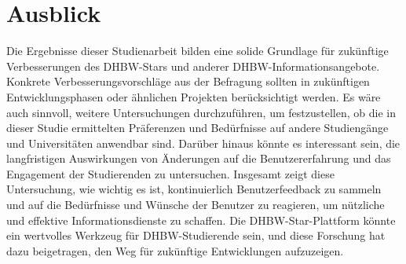 \section{Ausblick}
Die Ergebnisse dieser Studienarbeit bilden eine solide Grundlage für zukünftige Verbesserungen des DHBW-Stars und anderer DHBW-Informationsangebote. Konkrete Verbesserungsvorschläge aus der Befragung sollten in zukünftigen Entwicklungsphasen  oder ähnlichen Projekten berücksichtigt werden. 
Es wäre auch sinnvoll, weitere Untersuchungen durchzuführen, um festzustellen, ob die in dieser Studie ermittelten Präferenzen und Bedürfnisse  auf andere Studiengänge und Universitäten anwendbar sind. Darüber hinaus könnte es interessant sein, die langfristigen Auswirkungen von  Änderungen auf die Benutzererfahrung und das Engagement der Studierenden zu untersuchen. 
Insgesamt zeigt diese Untersuchung, wie wichtig es ist, kontinuierlich Benutzerfeedback zu sammeln und auf die Bedürfnisse und Wünsche der Benutzer zu reagieren, um nützliche und effektive Informationsdienste zu schaffen. Die DHBW-Star-Plattform könnte ein wertvolles Werkzeug für DHBW-Studierende sein, und diese Forschung hat dazu beigetragen, den Weg für zukünftige Entwicklungen aufzuzeigen.